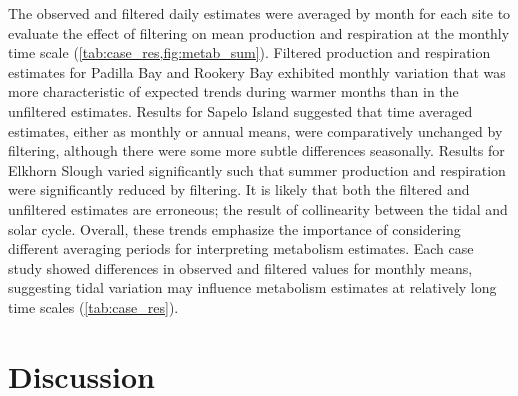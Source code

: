 \documentclass[letterpaper,12pt,oneside]{article}\usepackage[]{graphicx}\usepackage[]{color}
\begin{document}
The observed and filtered daily estimates were averaged by month for each site to evaluate the effect of filtering on mean production and respiration at the monthly time scale (\cref{tab:case_res,fig:metab_sum}).  Filtered production and respiration estimates for Padilla Bay and Rookery Bay exhibited monthly variation that was more characteristic of expected trends during warmer months than in the unfiltered estimates.  Results for Sapelo Island suggested that time averaged estimates, either as monthly or annual means, were comparatively unchanged by filtering, although there were some more subtle differences seasonally.  Results for Elkhorn Slough varied significantly such that summer production and respiration were significantly reduced by filtering. It is likely that both the filtered and unfiltered estimates are erroneous; the result of collinearity between the tidal and solar cycle.  Overall, these trends emphasize the importance of considering different averaging periods for interpreting metabolism estimates.  Each case study showed differences in observed and filtered values for monthly means, suggesting tidal variation may influence metabolism estimates at relatively long time scales (\cref{tab:case_res}).      

 

\section{Discussion}
\end{document}
